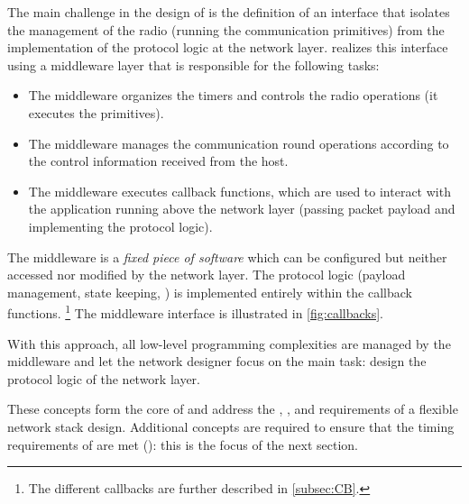 The main challenge in the design of \baloo is the definition of an interface that isolates the management of the radio (\ie running the \ST communication primitives) from the implementation of the protocol logic at the network layer.
%
\baloo realizes this interface using a middleware layer that is responsible for the following tasks:
\begin{itemize}

	\item The middleware organizes the timers and controls the radio operations (\ie it executes the \ST primitives).

	\item The middleware manages the communication round operations according to the control information received from the host.

	\item The middleware executes callback functions, which are used to interact with the application running above the network layer (\ie passing packet payload and implementing the protocol logic).

\end{itemize}
The middleware is a \textsl{fixed piece of software} which can be configured but neither accessed nor modified by the network layer.
The protocol logic (payload management, state keeping, \etc) is implemented entirely within the callback functions.%
\footnote{The different callbacks are further described in \cref{subsec:CB}.}
The middleware interface is illustrated in \cref{fig:callbacks}.

With this approach, all low-level programming complexities are managed by the middleware and let the network designer focus on the main task: design the protocol logic of the network layer.

These concepts form the core of \baloo and address the , ,  and  requirements of a flexible network stack design.
Additional concepts are required to ensure that the timing requirements of \ST are met (): this is the focus of the next section.
